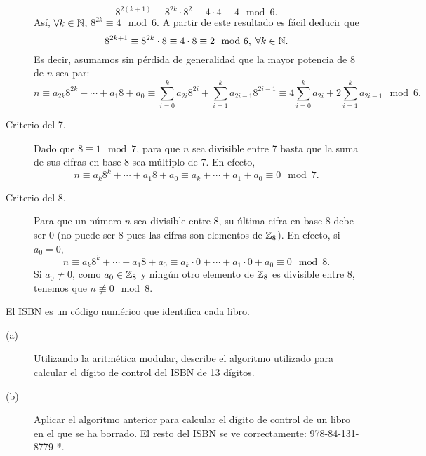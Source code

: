 \documentclass{article}
\begin{document}
\begin{sol}
\begin{description}
	\[8^{2\left(k+1\right)}\equiv8^{2k} \cdot 8^{2} \equiv 4 \cdot 4 \equiv 4 \mod 6 .\]
Así, $\displaystyle \forall k \in \mathbb{N} $, $\displaystyle 8^{2k} \equiv 4 \mod 6 $. A partir de este resultado es fácil deducir que 
\[8^{2k+1} \equiv 8^{2k} \cdot 8 \equiv 4 \cdot 8 \equiv 2 \mod 6, \; \forall k \in \mathbb{N} .\]
Es decir, asumamos sin pérdida de generalidad que la mayor potencia de 8 de $\displaystyle n $ sea par:
\[ n \equiv a_{2k}8^{2k} + \cdots + a_{1}8+a_{0} \equiv \sum^{k}_{i=0}a_{2i}8^{2i} + \sum^{k}_{i = 1}a_{2i-1}8^{2i-1} \equiv 4 \sum^{k}_{i=0}a_{2i} + 2\sum^{k}_{i=1}a_{2i-1} \mod 6 .\]
\item[Criterio del 7.] Dado que $\displaystyle 8 \equiv 1 \mod 7$, para que $\displaystyle n $ sea divisible entre 7 basta que la suma de sus cifras en base 8 sea múltiplo de 7. En efecto,
	\[n \equiv a_{k}8^{k} + \cdots + a_{1}8+a_{0} \equiv a_{k} + \cdots + a_{1} + a_{0} \equiv 0 \mod 7 .\]
\item[Criterio del 8.] Para que un número $\displaystyle n $ sea divisible entre 8, su última cifra en base 8 debe ser 0 (no puede ser 8 pues las cifras son elementos de $\displaystyle \mathbb{Z}_{8} $). En efecto, si $\displaystyle a_{0} = 0 $,
	\[n \equiv a_{k}8^{k} + \cdots + a_{1}8+a_{0} \equiv a_{k} \cdot 0 + \cdots + a_{1} \cdot 0 + a_{0} \equiv 0 \mod 8 .\]
	Si $\displaystyle a_{0} \neq 0 $, como $\displaystyle a_{0} \in \mathbb{Z}_{8} $ y ningún otro elemento de $\displaystyle \mathbb{Z}_{8} $ es divisible entre 8, tenemos que $\displaystyle n \not \equiv 0 \mod 8 $.
\end{description}

\end{sol}

\begin{ej}
El ISBN es un código numérico que identifica cada libro. 
\begin{description}
\item[(a)] Utilizando la aritmética modular, describe el algoritmo utilizado para calcular el dígito de control del ISBN de 13 dígitos.
\item[(b)] Aplicar el algoritmo anterior para calcular el dígito de control de un libro en el que se ha borrado. El resto del ISBN se ve correctamente: 978-84-131-8779-*. 
\end{description}
\end{ej}
\end{document}
